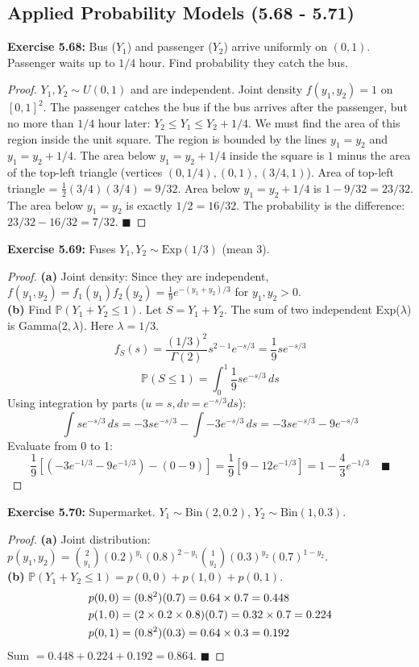 \documentclass[11pt, a4paper]{article}
\theoremstyle{definition}
\theoremstyle{remark}
\newcommand{\Prob}{\mathbb{P}}
\begin{document}
\subsection{Applied Probability Models (5.68 - 5.71)}

\textbf{Exercise 5.68:} Bus ($Y_1$) and passenger ($Y_2$) arrive uniformly on $(0,1)$. Passenger waits up to $1/4$ hour. Find probability they catch the bus.
\begin{proof}
$Y_1, Y_2 \sim U(0,1)$ and are independent. Joint density $f(y_1, y_2) = 1$ on $[0,1]^2$.
The passenger catches the bus if the bus arrives after the passenger, but no more than $1/4$ hour later: $Y_2 \le Y_1 \le Y_2 + 1/4$.
We must find the area of this region inside the unit square.
The region is bounded by the lines $y_1 = y_2$ and $y_1 = y_2 + 1/4$.
The area below $y_1 = y_2 + 1/4$ inside the square is $1$ minus the area of the top-left triangle (vertices $(0, 1/4), (0,1), (3/4, 1)$).
Area of top-left triangle = $\frac{1}{2}(3/4)(3/4) = 9/32$.
Area below $y_1 = y_2 + 1/4$ is $1 - 9/32 = 23/32$.
The area below $y_1 = y_2$ is exactly $1/2 = 16/32$.
The probability is the difference: $23/32 - 16/32 = 7/32$. $\blacksquare$
\end{proof}

\textbf{Exercise 5.69:} Fuses $Y_1, Y_2 \sim \text{Exp}(1/3)$ (mean 3).
\begin{proof}
\textbf{(a)} Joint density: Since they are independent, $f(y_1, y_2) = f_1(y_1)f_2(y_2) = \frac{1}{9}e^{-(y_1+y_2)/3}$ for $y_1, y_2 > 0$. \\
\textbf{(b)} Find $\Prob(Y_1 + Y_2 \le 1)$. Let $S = Y_1 + Y_2$. The sum of two independent Exp($\lambda$) is Gamma($2, \lambda$). Here $\lambda = 1/3$.
\[ f_S(s) = \frac{(1/3)^2}{\Gamma(2)} s^{2-1} e^{-s/3} = \frac{1}{9} s e^{-s/3} \]
\[ \Prob(S \le 1) = \int_{0}^{1} \frac{1}{9} s e^{-s/3} \, ds \]
Using integration by parts ($u=s, dv=e^{-s/3}ds$):
\[ \int s e^{-s/3} \, ds = -3s e^{-s/3} - \int -3 e^{-s/3} \, ds = -3s e^{-s/3} - 9 e^{-s/3} \]
Evaluate from 0 to 1:
\[ \frac{1}{9} \left[ (-3e^{-1/3} - 9e^{-1/3}) - (0 - 9) \right] = \frac{1}{9} \left[ 9 - 12e^{-1/3} \right] = 1 - \frac{4}{3}e^{-1/3} \quad \blacksquare \]
\end{proof}

\textbf{Exercise 5.70:} Supermarket. $Y_1 \sim \text{Bin}(2, 0.2)$, $Y_2 \sim \text{Bin}(1, 0.3)$.
\begin{proof}
\textbf{(a)} Joint distribution: $p(y_1, y_2) = \binom{2}{y_1}(0.2)^{y_1}(0.8)^{2-y_1} \binom{1}{y_2}(0.3)^{y_2}(0.7)^{1-y_2}$. \\
\textbf{(b)} $\Prob(Y_1 + Y_2 \le 1) = p(0,0) + p(1,0) + p(0,1)$.
\begin{align*}
p(0,0) &= (0.8^2)(0.7) = 0.64 \times 0.7 = 0.448 \\ \relax
p(1,0) &= (2 \times 0.2 \times 0.8)(0.7) = 0.32 \times 0.7 = 0.224 \\ \relax
p(0,1) &= (0.8^2)(0.3) = 0.64 \times 0.3 = 0.192
\end{align*}
Sum $= 0.448 + 0.224 + 0.192 = 0.864$. $\blacksquare$
\end{proof}
\end{document}

